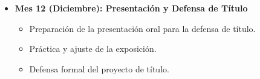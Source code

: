 \documentclass[final,letterpaper,oneside,authoryear,11pt,singlespace,spanish]{ezthesis}
\begin{document}
\begin{itemize}[leftmargin=*,labelsep=0.5cm]
\begin{itemize}
        \item Comparación sistemática del pipeline híbrido con técnicas del estado del arte.
    \end{itemize}
    \item \textbf{Mes 12 (Diciembre): Presentación y Defensa de Título}
    \begin{itemize}
        \item Preparación de la presentación oral para la defensa de título.
        \item Práctica y ajuste de la exposición.
        \item Defensa formal del proyecto de título.
    \end{itemize}
\end{itemize}

\newpage
\label{anexo:Gantt}

\end{document}
